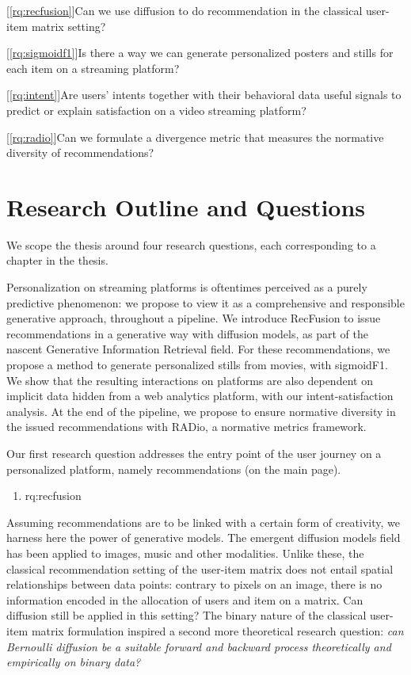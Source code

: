 
[\ref{rq:recfusion}]{Can we use diffusion to do recommendation in the classical user-item matrix setting?}

[\ref{rq:sigmoidf1}]{Is there a way we can generate personalized posters and stills for each item on a streaming platform?}

[\ref{rq:intent}]{Are users' intents together with their behavioral data useful signals to predict or explain satisfaction on a video streaming platform?}

[\ref{rq:radio}]{Can we formulate a divergence metric that measures the normative diversity of recommendations?}

\section{Research Outline and Questions}
\label{section:introduction:rqs}


We scope the thesis around four research questions, each corresponding to a chapter in the thesis.

Personalization on streaming platforms is oftentimes perceived as a purely predictive phenomenon: we propose to view it as a comprehensive and responsible generative approach, throughout a pipeline. We introduce RecFusion to issue recommendations in a generative way with diffusion models, as part of the nascent Generative Information Retrieval field. For these recommendations, we propose a method to generate personalized stills from movies, with sigmoidF1. We show that the resulting interactions on platforms are also dependent on implicit data hidden from a web analytics platform, with our intent-satisfaction analysis. At the end of the pipeline, we propose to ensure normative diversity in the issued recommendations with RADio, a normative metrics framework.

Our first research question addresses the entry point of the user journey on a personalized platform, namely recommendations (on the main page).


\begin{enumerate}[label=\textbf{RQ\arabic*},ref={RQ\arabic*},resume,leftmargin=*]
	\item \acl{rq:recfusion}\label{rq:recfusion}
\end{enumerate}

Assuming recommendations are to be linked with a certain form of creativity, we harness here the power of generative models. The emergent diffusion models field has been applied to images, music and other modalities. Unlike these, the classical recommendation setting of the user-item matrix does not entail spatial relationships between data points: contrary to pixels on an image, there is no information encoded in the allocation of users and item on a matrix. Can diffusion still be applied in this setting? The binary nature of the classical user-item matrix formulation inspired a second more theoretical research question: \emph{can Bernoulli diffusion be a suitable forward and backward process theoretically and empirically on binary data?}

